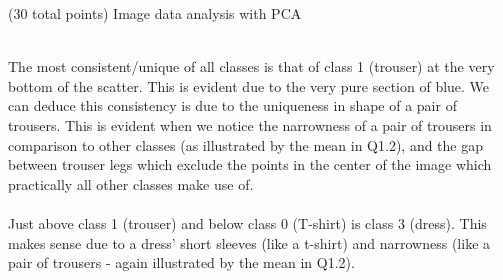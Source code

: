 \documentclass[12pt]{article}
\begin{document}
\begin{question}{(30 total points) Image data analysis with PCA}
\begin{subquestion}
\begin{answerbox}{40em}
{\\
        The most consistent/unique of all classes is that of class 1 (trouser) at the very bottom of the scatter. This is evident due to the very pure section of blue. We can deduce this consistency is due to the uniqueness in shape of a pair of trousers. This is evident when we notice the narrowness of a pair of trousers in comparison to other classes (as illustrated by the mean in Q1.2), and the gap between trouser legs which exclude the points in the center of the image which practically all other classes make use of.\\
\\
        Just above class 1 (trouser) and below class 0 (T-shirt) is class 3 (dress). This makes sense due to a dress' short sleeves (like a t-shirt) and narrowness (like a pair of trousers - again illustrated by the mean in Q1.2).
        }
      \end{answerbox}
  


   \end{subquestion}
   

\end{question}
\clearpage
%
%
\end{document}
